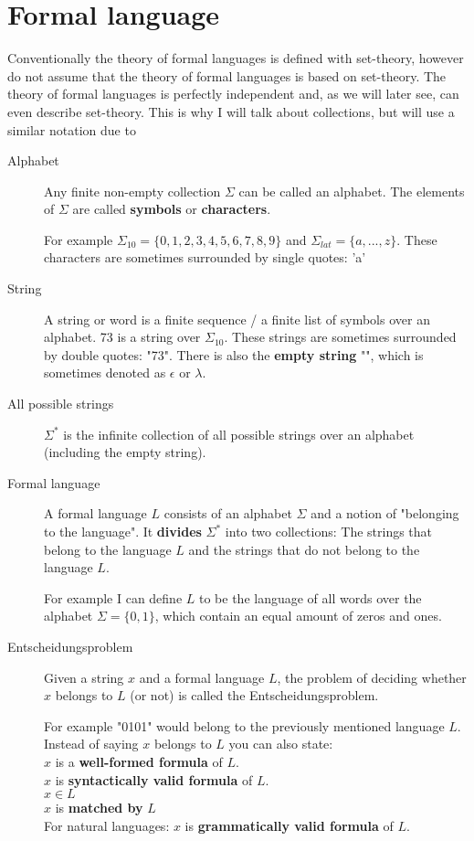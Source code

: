 \section{Formal language}
Conventionally the theory of formal languages is defined with set-theory, however do not assume that the theory of formal languages is based on set-theory. The theory of formal languages is perfectly independent and, as we will later see, can even describe set-theory. This is why I will talk about collections, but will use a similar notation due to 

\begin{description}
	\item[Alphabet] Any finite non-empty collection $\Sigma$ can be called an alphabet. The elements of $\Sigma$ are called \textbf{symbols} or \textbf{characters}.
	
	For example $\Sigma_{10} = \{0,1,2,3,4,5,6,7,8,9\}$ and $\Sigma_{lat} = \{a,...,z\}$.
	These characters are sometimes surrounded by single quotes: 'a'
	\item[String] A string or word is a finite sequence / a finite list of symbols over an alphabet. 73 is a string over $\Sigma_{10}$.
	These strings are sometimes surrounded by double quotes: "73".
	There is also the \textbf{empty string} "", which is sometimes denoted as $\epsilon$ or $\lambda$.
	\item[All possible strings] $\Sigma^*$ is the infinite collection of all possible strings over an alphabet (including the empty string). 
	\item[Formal language] A formal language $L$ consists of an alphabet $\Sigma$ and a notion of "belonging to the language". It \textbf{divides} $\Sigma^*$ into two collections: The strings that belong to the language $L$ and the strings that do not belong to the language $L$.
		
		For example I can define $L$ to be the language of all words over the alphabet $\Sigma=\{0,1\}$, which contain an equal amount of zeros and ones.
				
	\item[Entscheidungsproblem] Given a string $x$ and a formal language $L$, the problem of deciding whether $x$ belongs to $L$ (or not) is called the Entscheidungsproblem.
		
	 	For example "0101" would belong to the previously mentioned language $L$.
		Instead of saying $x$ belongs to $L$ you can also state: \\
		$x$ is a \textbf{well-formed formula} of $L$. \\
		$x$ is \textbf{syntactically valid formula} of $L$. \\
		$x \in L$ \\
		$x$ is \textbf{matched by} $L$ \\
		For natural languages:
		$x$ is \textbf{grammatically valid formula} of $L$. 

\end{description}

